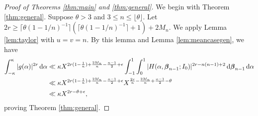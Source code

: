 \documentclass[11pt,reqno]{amsart}
\numberwithin{equation}{section}
\renewcommand{\d}{\,{\rm d}}
\begin{document}
\begin{proof}[Proof of Theorems \ref{thm:main} and \ref{thm:general}]
We begin with Theorem \ref{thm:general}. Suppose $\theta > 3$ and $3 \leq n \leq \lfloor \theta \rfloor$. Let $2r \geq \lceil \theta(1-1/n)^{-1} \rceil(\lceil \theta(1-1/n)^{-1}\rceil+1)+2M_n$. We apply Lemma \ref{lem:taylor} with $u=v = n$. By this lemma and Lemma \ref{lem:meancasegen}, we have 
\begin{align*} \int_{-\kappa}^{\kappa} |g(\alpha)|^{2r} \d\alpha & \ll \kappa X^{2r(1-\frac{1}{n})+\frac{2M_n}{n}-\frac{n-1}{2}+\epsilon} \int_{-1}^{1} \int_{0}^{1} |H(\alpha,\boldsymbol{\beta}_{n-1};I_0 )|^{2r-n(n-1)+2} \d \boldsymbol{\beta}_{n-1} \d \alpha
\\ 
& \ll \kappa X^{2r(1-\frac{1}{n})+\frac{2M_n}{n}-\frac{n-1}{2}+\epsilon} X^{\frac{2r}{n}-\frac{2M_n}{n}+\frac{n-1}{2}-\theta}
\\ 
& \ll \kappa X^{2r-\theta+\epsilon}, 
\end{align*}
proving Theorem \ref{thm:general}. 


\end{proof}
\end{document}

